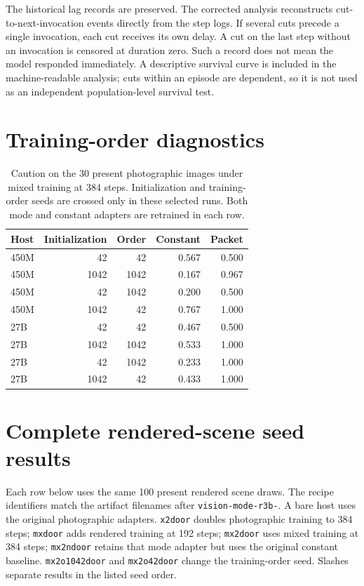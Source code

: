 \documentclass[10pt]{article}
\begin{document}
The historical lag records are preserved. The corrected analysis
reconstructs cut-to-next-invocation events directly from the step
logs. If several cuts precede a single invocation, each cut
receives its own delay. A cut on the last step without an
invocation is censored at duration zero. Such a record does not
mean the model responded immediately. A descriptive survival
curve is included in the machine-readable analysis; cuts within
an episode are dependent, so it is not used as an independent
population-level survival test.

\section{Training-order diagnostics}
\begin{table}[htbp]\centering\small
\caption{Caution on the 30 present photographic images under
mixed training at 384 steps. Initialization and training-order
seeds are crossed only in these selected runs. Both mode and
constant adapters are retrained in each row.}\label{tab:order}
\begin{tabular}{lrrrr}\toprule
Host & Initialization & Order & Constant & Packet\\\midrule
450M & 42 & 42 & 0.567 & 0.500 \\
450M & 1042 & 1042 & 0.167 & 0.967 \\
450M & 42 & 1042 & 0.200 & 0.500 \\
450M & 1042 & 42 & 0.767 & 1.000 \\
27B & 42 & 42 & 0.467 & 0.500 \\
27B & 1042 & 1042 & 0.533 & 1.000 \\
27B & 42 & 1042 & 0.233 & 1.000 \\
27B & 1042 & 42 & 0.433 & 1.000 \\

\bottomrule\end{tabular}
\end{table}

\section{Complete rendered-scene seed results}\label{app:transfer}
Each row below uses the same 100 present rendered scene draws.
The recipe identifiers match the artifact filenames after
\texttt{vision-mode-r3b-}. A bare host uses the original
photographic adapters. \texttt{x2door} doubles photographic
training to 384 steps; \texttt{mxdoor} adds rendered training
at 192 steps; \texttt{mx2door} uses mixed training at 384 steps;
\texttt{mx2ndoor} retains that mode adapter but uses the original
constant baseline. \texttt{mx2o1042door} and
\texttt{mx2o42door} change the training-order seed. Slashes
separate results in the listed seed order.
\end{document}
